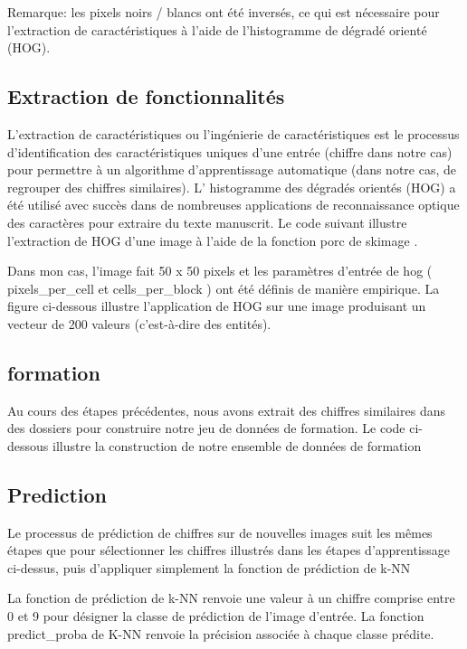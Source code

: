 \documentclass[11pt]{report}
\begin{document}
Remarque: les pixels noirs / blancs ont été inversés, ce qui est nécessaire pour l'extraction de caractéristiques à l'aide de l'histogramme de dégradé orienté (HOG).

\subsection{Extraction de fonctionnalités}

L'extraction de caractéristiques ou l'ingénierie de caractéristiques est le processus d'identification des caractéristiques uniques d'une entrée (chiffre dans notre cas) pour permettre à un algorithme d'apprentissage automatique (dans notre cas, de regrouper des chiffres similaires). L’ histogramme des dégradés orientés (HOG) a été utilisé avec succès dans de nombreuses applications de reconnaissance optique des caractères pour extraire du texte manuscrit. Le code suivant illustre l'extraction de HOG d'une image à l'aide de la fonction porc de skimage .

Dans mon cas, l'image fait 50 x 50 pixels et les paramètres d'entrée de hog ( pixels\_per\_cell et cells\_per\_block ) ont été définis de manière empirique. La figure ci-dessous illustre l'application de HOG sur une image produisant un vecteur de 200 valeurs (c'est-à-dire des entités).

\subsection{formation}
Au cours des étapes précédentes, nous avons extrait des chiffres similaires dans des dossiers pour construire notre jeu de données de formation. Le code ci-dessous illustre la construction de notre ensemble de données de formation 


\subsection{Prediction}

Le processus de prédiction de chiffres sur de nouvelles images suit les mêmes étapes que pour sélectionner les chiffres illustrés dans les étapes d'apprentissage ci-dessus, puis d'appliquer simplement la fonction de prédiction de k-NN 

La fonction de prédiction de k-NN renvoie une valeur à un chiffre comprise entre 0 et 9 pour désigner la classe de prédiction de l'image d'entrée. La fonction predict\_proba de K-NN renvoie la précision associée à chaque classe prédite.
\end{document}
